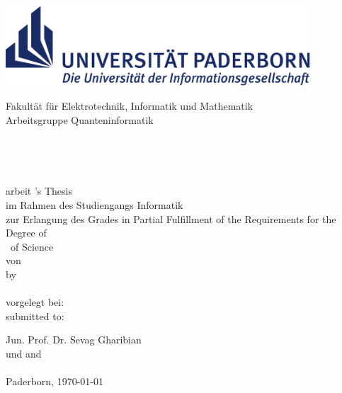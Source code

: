 
\thispagestyle{empty}
\begin{titlepage}
\begin{center}

	\begin{minipage}{14cm}		
		\hspace*{1.9cm}
		\includegraphics[height=3cm]{figures/upb_logo}\\
		\hspace*{1.15cm}
		\begin{minipage}{14.5cm}
			\vspace*{5pt}
			\textsf{\noindent
			Fakultät für Elektrotechnik, Informatik und Mathematik\\
			Arbeitsgruppe Quanteninformatik
			}
		\end{minipage}		
	\end{minipage}\\[60pt]
	
	\begin{doublespace}
		{\Huge\textbf{\Title}}\\[30pt]
	\end{doublespace} 
	
	{\Large 
		\ifgerman
			\Degree arbeit
		\else
			\Degree 's Thesis
		\fi
	}\\[6pt]
		\ifgerman
			im Rahmen des Studiengangs Informatik\\
			zur Erlangung des Grades
		\else
			in Partial Fulfillment of the Requirements for the\\
			Degree of
		\fi
		\\[6pt]
  	{\Large \Degree\ of Science}\\[54pt] %
	
	\ifgerman
		von\\
	\else
		by\\
	\fi
	{\scshape\large \Author}\\[54pt]
	
	\ifgerman
		vorgelegt bei:\\
	\else
		submitted to:\\
	\fi
	
	{\large Jun. Prof. Dr. Sevag Gharibian \\
	\ifgerman
		und
	\else
		and
	\fi
	\\[6pt]
	\large \SecondExaminer}\\[30pt]

	{Paderborn, \today}
	
\end{center}
\end{titlepage}
\clearpage